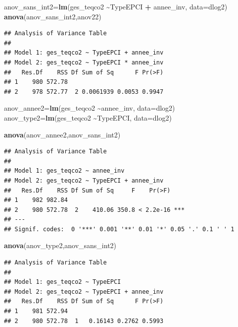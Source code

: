 \documentclass[
]{article}
\newenvironment{Shaded}{\begin{snugshade}}{\end{snugshade}}
\newcommand{\AttributeTok}[1]{\textcolor[rgb]{0.13,0.29,0.53}{#1}}
\newcommand{\FunctionTok}[1]{\textcolor[rgb]{0.13,0.29,0.53}{\textbf{#1}}}
\newcommand{\NormalTok}[1]{#1}
\newcommand{\OtherTok}[1]{\textcolor[rgb]{0.56,0.35,0.01}{#1}}
\newcommand{\SpecialCharTok}[1]{\textcolor[rgb]{0.81,0.36,0.00}{\textbf{#1}}}
\begin{document}
\begin{Shaded}
\begin{Highlighting}[]
\NormalTok{anov\_sans\_int2}\OtherTok{=}\FunctionTok{lm}\NormalTok{(ges\_teqco2 }\SpecialCharTok{\textasciitilde{}}\NormalTok{TypeEPCI }\SpecialCharTok{+}\NormalTok{ annee\_inv, }\AttributeTok{data=}\NormalTok{dlog2)}
\FunctionTok{anova}\NormalTok{(anov\_sans\_int2,anov22)}
\end{Highlighting}
\end{Shaded}

\begin{verbatim}
## Analysis of Variance Table
## 
## Model 1: ges_teqco2 ~ TypeEPCI + annee_inv
## Model 2: ges_teqco2 ~ TypeEPCI * annee_inv
##   Res.Df    RSS Df Sum of Sq      F Pr(>F)
## 1    980 572.78                           
## 2    978 572.77  2 0.0061939 0.0053 0.9947
\end{verbatim}

\begin{Shaded}
\begin{Highlighting}[]
\NormalTok{anov\_annee2}\OtherTok{=}\FunctionTok{lm}\NormalTok{(ges\_teqco2 }\SpecialCharTok{\textasciitilde{}}\NormalTok{annee\_inv, }\AttributeTok{data=}\NormalTok{dlog2)}
\NormalTok{anov\_type2}\OtherTok{=}\FunctionTok{lm}\NormalTok{(ges\_teqco2 }\SpecialCharTok{\textasciitilde{}}\NormalTok{TypeEPCI, }\AttributeTok{data=}\NormalTok{dlog2)}

\FunctionTok{anova}\NormalTok{(anov\_annee2,anov\_sans\_int2)}
\end{Highlighting}
\end{Shaded}

\begin{verbatim}
## Analysis of Variance Table
## 
## Model 1: ges_teqco2 ~ annee_inv
## Model 2: ges_teqco2 ~ TypeEPCI + annee_inv
##   Res.Df    RSS Df Sum of Sq     F    Pr(>F)    
## 1    982 982.84                                 
## 2    980 572.78  2    410.06 350.8 < 2.2e-16 ***
## ---
## Signif. codes:  0 '***' 0.001 '**' 0.01 '*' 0.05 '.' 0.1 ' ' 1
\end{verbatim}

\begin{Shaded}
\begin{Highlighting}[]
\FunctionTok{anova}\NormalTok{(anov\_type2,anov\_sans\_int2)}
\end{Highlighting}
\end{Shaded}

\begin{verbatim}
## Analysis of Variance Table
## 
## Model 1: ges_teqco2 ~ TypeEPCI
## Model 2: ges_teqco2 ~ TypeEPCI + annee_inv
##   Res.Df    RSS Df Sum of Sq      F Pr(>F)
## 1    981 572.94                           
## 2    980 572.78  1   0.16143 0.2762 0.5993
\end{verbatim}
\end{document}
